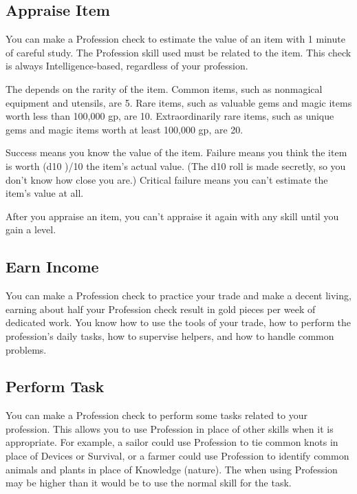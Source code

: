     \subsection{Appraise Item}
        You can make a Profession check to estimate the value of an item with 1 minute of careful study. The Profession skill used must be related to the item.
        This check is always Intelligence-based, regardless of your profession.

        The  depends on the rarity of the item. Common items, such as nonmagical equipment and utensils, are  5. Rare items, such as valuable gems and magic items worth less than 100,000 gp, are  10. Extraordinarily rare items, such as unique gems and magic items worth at least 100,000 gp, are  20.

        Success means you know the value of the item. Failure means you think the item is worth (d10 )/10 \x the item's actual value. (The d10 roll is made secretly, so you don't know how close you are.) Critical failure means you can't estimate the item's value at all.

        After you appraise an item, you can't appraise it again with any skill until you gain a level.

    \subsection{Earn Income}
        You can make a Profession check to practice your trade and make a decent living, earning about half your Profession check result in gold pieces per week of dedicated work. You know how to use the tools of your trade, how to perform the profession's daily tasks, how to supervise helpers, and how to handle common problems.

    \subsection{Perform Task}
        You can make a Profession check to perform some tasks related to your profession. This allows you to use Profession in place of other skills when it is appropriate. For example, a sailor could use Profession to tie common knots in place of Devices or Survival, or a farmer could use Profession to identify common animals and plants in place of Knowledge (nature). The  when using Profession may be higher than it would be to use the normal skill for the task.

